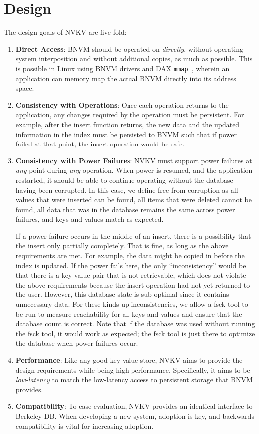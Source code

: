 \section{Design}

The design goals of NVKV are five-fold:
\begin{enumerate}
	\item \textbf{Direct Access}: BNVM should be operated on \textit{directly},
		without operating system interposition and without additional copies, as
		much as possible. This is possible in Linux using BNVM drivers and DAX
		\texttt{mmap}~\cite{dax}, wherein an application can memory map the
		actual BNVM directly into its address space.
	\item \textbf{Consistency with Operations}: Once each operation returns to
		the application, any changes required by the operation must be
		persistent. For example, after the insert function returns, the new data
		and the updated information in the index must be persisted to BNVM such
		that if power failed at that point, the insert operation would be safe.
	\item \textbf{Consistency with Power Failures}: NVKV must support power
		failures at \textit{any} point during \textit{any} operation. When power
		is resumed, and the application restarted, it should be able to continue
		operating without the database having been corrupted. In this case, we
		define free from corruption as all values that were inserted can be
		found, all items that were deleted cannot be found, all data that was in
		the database remains the same across power failures, and keys and values
		match as expected.

		If a power failure occurs in the middle of an insert, there is a
		possibility that the insert only partially completely. That is fine, as
		long as the above requirements are met. For example, the data might be
		copied in before the index is updated. If the power fails here, the only
		``inconsistency'' would be that there is a key-value pair that is not
		retrievable, which does not violate the above requirements because the
		insert operation had not yet returned to the user. However, this
		database state is sub-optimal since it contains unnecessary data. For
		these kinds up inconsistencies, we allow a fsck tool to be run to
		measure reachability for all keys and values and ensure that the
		database count is correct. Note that if the database was used without
		running the fsck tool, it would work as expected; the fsck tool is just
		there to optimize the database when power failures occur.
	\item \textbf{Performance}: Like any good key-value store, NVKV aims to
		provide the design requirements while being high performance.
		Specifically, it aims to be \textit{low-latency} to match the
		low-latency access to persistent storage that BNVM provides.
	\item \textbf{Compatibility}: To ease evaluation, NVKV provides an identical
		interface to Berkeley DB. When developing a new system, adoption is key,
		and backwards compatibility is vital for increasing adoption.
\end{enumerate}


